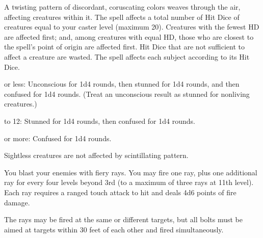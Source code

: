 \begin{multicols}{2}
\begin{small}

\noindent A twisting pattern of discordant, coruscating colors weaves through the air, affecting creatures within it. The spell affects a total number of Hit Dice of creatures equal to your caster level (maximum 20). Creatures with the fewest HD are affected first; and, among creatures with equal HD, those who are closest to the spell's point of origin are affected first. Hit Dice that are not sufficient to affect a creature are wasted. The spell affects each subject according to its Hit Dice.

\smallskip{} or less: Unconscious for 1d4 rounds, then stunned for 1d4 rounds, and then confused for 1d4 rounds. (Treat an unconscious result as stunned for nonliving creatures.)

\smallskip{} to 12: Stunned for 1d4 rounds, then confused for 1d4 rounds. 

\smallskip{} or more: Confused for 1d4 rounds. 

\smallskip\noindent Sightless creatures are not affected by scintillating pattern.


\noindent You blast your enemies with fiery rays. You may fire one ray, plus one additional ray for every four levels beyond 3rd (to a maximum of three rays at 11th level). Each ray requires a ranged touch attack to hit and deals 4d6 points of fire damage.

\smallskip\noindent The rays may be fired at the same or different targets, but all bolts must be aimed at targets within 30 feet of each other and fired simultaneously.


\end{small}
\end{multicols}
